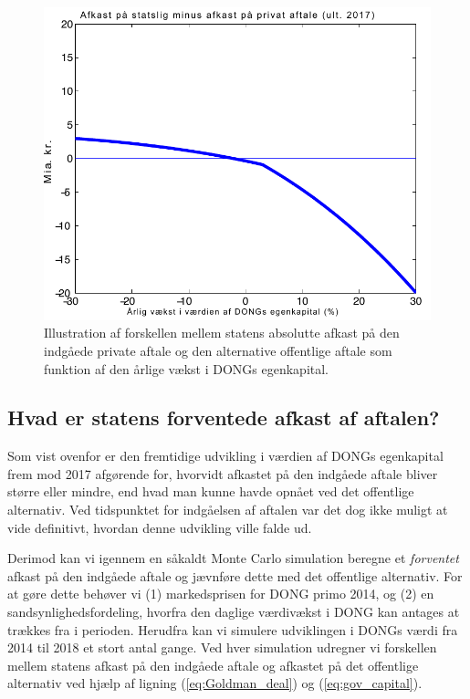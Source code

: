 \documentclass{article}
\begin{document}
\begin{figure}
\includegraphics[scale=0.8, trim=0mm 0mm 0mm 0mm]{../matlab/figs/private_less_public_deal.pdf}
\caption{Illustration af forskellen mellem statens absolutte afkast p\aa{} den indg\aa{}ede private aftale og den alternative offentlige aftale som funktion af den \aa{}rlige v\ae{}kst i DONGs egenkapital. }
\label{fig:comp}
\end{figure}


\subsection{Hvad er statens forventede afkast af aftalen?}

Som vist ovenfor er den fremtidige udvikling i værdien af DONGs egenkapital frem mod 2017 afgørende for, hvorvidt afkastet på den indgåede aftale bliver større eller mindre, end hvad man kunne havde opnået ved det offentlige alternativ. Ved tidspunktet for indgåelsen af aftalen var det dog ikke muligt at vide definitivt, hvordan denne udvikling ville falde ud. 

Derimod kan vi igennem en såkaldt Monte Carlo simulation beregne et \emph{forventet} afkast på den indgåede aftale og jævnføre dette med det offentlige alternativ. For at gøre dette behøver vi (1) markedsprisen for DONG primo 2014, og (2) en sandsynlighedsfordeling, hvorfra den daglige værdivækst i DONG kan antages at trækkes fra i perioden. Herudfra kan vi simulere udviklingen i DONGs værdi fra 2014 til 2018 et stort antal gange. Ved hver simulation udregner vi forskellen mellem statens afkast på den indgåede aftale og afkastet på det offentlige alternativ ved hjælp af ligning (\ref{eq:Goldman_deal}) og (\ref{eq:gov_capital}).
\end{document}
